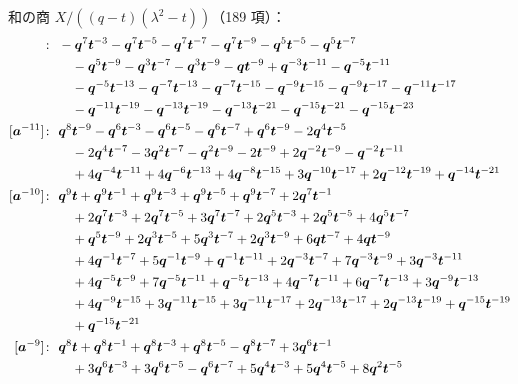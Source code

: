 和の商 $X/((q - t)(\lambda^2 - t))$（189 項）：
\begin{align*}
[\ba^{-12}]\colon\ & -\bq^{7} \bt^{-3} -\bq^{7} \bt^{-5} -\bq^{7} \bt^{-7} -\bq^{7} \bt^{-9} -\bq^{5} \bt^{-5} -\bq^{5} \bt^{-7} \\
& \quad -\bq^{5} \bt^{-9} -\bq^{3} \bt^{-7} -\bq^{3} \bt^{-9} -\bq \bt^{-9} +\bq^{-3} \bt^{-11} -\bq^{-5} \bt^{-11} \\
& \quad -\bq^{-5} \bt^{-13} -\bq^{-7} \bt^{-13} -\bq^{-7} \bt^{-15} -\bq^{-9} \bt^{-15} -\bq^{-9} \bt^{-17} -\bq^{-11} \bt^{-17} \\
& \quad -\bq^{-11} \bt^{-19} -\bq^{-13} \bt^{-19} -\bq^{-13} \bt^{-21} -\bq^{-15} \bt^{-21} -\bq^{-15} \bt^{-23} \\
[\ba^{-11}]\colon\ & \bq^{8} \bt^{-9} -\bq^{6} \bt^{-3} -\bq^{6} \bt^{-5} -\bq^{6} \bt^{-7} +\bq^{6} \bt^{-9} -2 \bq^{4} \bt^{-5} \\
& \quad -2 \bq^{4} \bt^{-7} -3 \bq^{2} \bt^{-7} -\bq^{2} \bt^{-9} -2 \bt^{-9} +2 \bq^{-2} \bt^{-9} -\bq^{-2} \bt^{-11} \\
& \quad +4 \bq^{-4} \bt^{-11} +4 \bq^{-6} \bt^{-13} +4 \bq^{-8} \bt^{-15} +3 \bq^{-10} \bt^{-17} +2 \bq^{-12} \bt^{-19} +\bq^{-14} \bt^{-21} \\
[\ba^{-10}]\colon\ & \bq^{9} \bt +\bq^{9} \bt^{-1} +\bq^{9} \bt^{-3} +\bq^{9} \bt^{-5} +\bq^{9} \bt^{-7} +2 \bq^{7} \bt^{-1} \\
& \quad +2 \bq^{7} \bt^{-3} +2 \bq^{7} \bt^{-5} +3 \bq^{7} \bt^{-7} +2 \bq^{5} \bt^{-3} +2 \bq^{5} \bt^{-5} +4 \bq^{5} \bt^{-7} \\
& \quad +\bq^{5} \bt^{-9} +2 \bq^{3} \bt^{-5} +5 \bq^{3} \bt^{-7} +2 \bq^{3} \bt^{-9} +6 \bq \bt^{-7} +4 \bq \bt^{-9} \\
& \quad +4 \bq^{-1} \bt^{-7} +5 \bq^{-1} \bt^{-9} +\bq^{-1} \bt^{-11} +2 \bq^{-3} \bt^{-7} +7 \bq^{-3} \bt^{-9} +3 \bq^{-3} \bt^{-11} \\
& \quad +4 \bq^{-5} \bt^{-9} +7 \bq^{-5} \bt^{-11} +\bq^{-5} \bt^{-13} +4 \bq^{-7} \bt^{-11} +6 \bq^{-7} \bt^{-13} +3 \bq^{-9} \bt^{-13} \\
& \quad +4 \bq^{-9} \bt^{-15} +3 \bq^{-11} \bt^{-15} +3 \bq^{-11} \bt^{-17} +2 \bq^{-13} \bt^{-17} +2 \bq^{-13} \bt^{-19} +\bq^{-15} \bt^{-19} \\
& \quad +\bq^{-15} \bt^{-21} \\
[\ba^{-9}]\colon\ & \bq^{8} \bt +\bq^{8} \bt^{-1} +\bq^{8} \bt^{-3} +\bq^{8} \bt^{-5} -\bq^{8} \bt^{-7} +3 \bq^{6} \bt^{-1} \\
& \quad +3 \bq^{6} \bt^{-3} +3 \bq^{6} \bt^{-5} -\bq^{6} \bt^{-7} +5 \bq^{4} \bt^{-3} +5 \bq^{4} \bt^{-5} +8 \bq^{2} \bt^{-5} \\

\end{align*}

